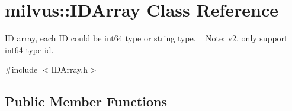 \hypertarget{classmilvus_1_1_i_d_array}{}\section{milvus\+:\+:I\+D\+Array Class Reference}
\label{classmilvus_1_1_i_d_array}


ID array, each ID could be int64 type or string type. ~\newline
Note\+: v2. only support int64 type id.  




{\ttfamily \#include $<$I\+D\+Array.\+h$>$}

\subsection*{Public Member Functions}
